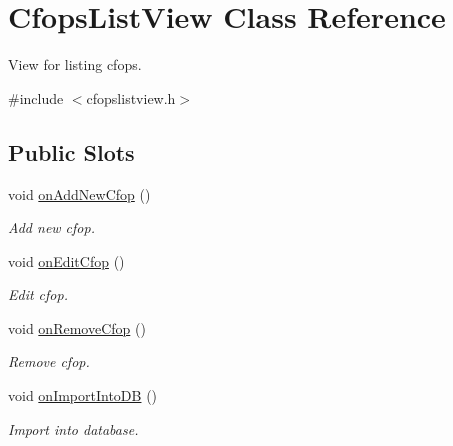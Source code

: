\hypertarget{class_cfops_list_view}{\section{\-Cfops\-List\-View \-Class \-Reference}
\label{class_cfops_list_view}
}


\-View for listing cfops.  




{\ttfamily \#include $<$cfopslistview.\-h$>$}

\subsection*{\-Public \-Slots}
\begin{DoxyCompactItemize}
\item 
void \hyperlink{class_cfops_list_view_ab3ebe359221b49828a340c7cdc02f7a8}{on\-Add\-New\-Cfop} ()
\begin{DoxyCompactList}\small\item\em \-Add new cfop. \end{DoxyCompactList}\item 
void \hyperlink{class_cfops_list_view_ae7b3358dba011c69cb0e71830cdd9635}{on\-Edit\-Cfop} ()
\begin{DoxyCompactList}\small\item\em \-Edit cfop. \end{DoxyCompactList}\item 
void \hyperlink{class_cfops_list_view_ac998ead90b04d25df908110a5bbf5aba}{on\-Remove\-Cfop} ()
\begin{DoxyCompactList}\small\item\em \-Remove cfop. \end{DoxyCompactList}\item 
void \hyperlink{class_cfops_list_view_a9d30a50e95c1a8ae9b9e3cd1ff9ccf4d}{on\-Import\-Into\-D\-B} ()
\begin{DoxyCompactList}\small\item\em \-Import into database. \end{DoxyCompactList}\end{DoxyCompactItemize}
